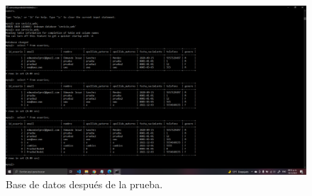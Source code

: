 \documentclass[11pt]{article}
\begin{document}
		\begin{figure}[H]
			\centering
			\includegraphics[scale=0.34]{resources/tp5.2.png}
			\caption{Base de datos después de la prueba.}\label{fig:picture}
		\end{figure}
\end{document}
